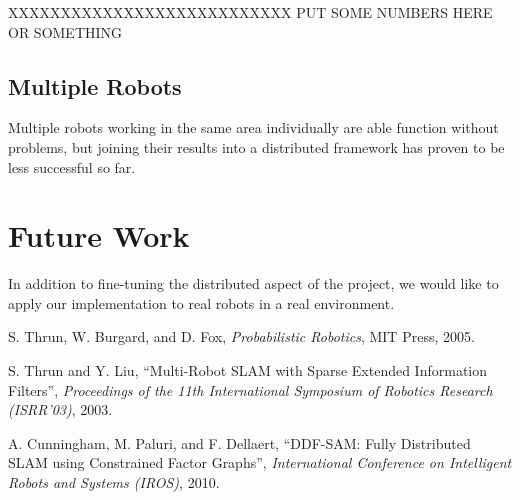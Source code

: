 \documentclass[prodmode,acmtecs]{acmsmall} %
\begin{document}
XXXXXXXXXXXXXXXXXXXXXXXXXXX PUT SOME NUMBERS HERE OR SOMETHING

\subsection{Multiple Robots}

Multiple robots working in the same area individually are able function without problems, but joining their results into a distributed framework has proven to be less successful so far.



\section{Future Work}

In addition to fine-tuning the distributed aspect of the project, we would like to apply our implementation to real robots in a real environment.

\begin{thebibliography}{12}
        S. Thrun, W. Burgard, and D. Fox, \emph{Probabilistic Robotics}, MIT Press, 2005.

        S. Thrun and Y. Liu, ``Multi-Robot SLAM with Sparse Extended Information Filters'', \emph{Proceedings of the 11th International Symposium of Robotics Research (ISRR'03)}, 2003.

        A. Cunningham, M. Paluri, and F. Dellaert, ``DDF-SAM: Fully Distributed SLAM using Constrained Factor Graphs'', \emph{International Conference on Intelligent Robots and Systems (IROS)}, 2010.

\end{thebibliography}
\end{document}
